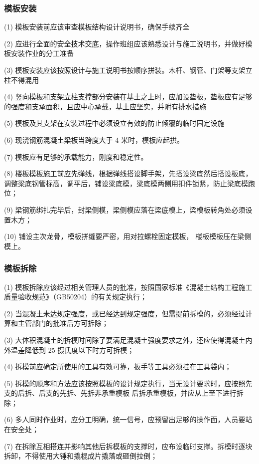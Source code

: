 \subsubsection{模板安装}

(1) 模板安装前应该审查模板结构设计说明书，确保手续齐全

(2) 应进行全面的安全技术交底，操作班组应该熟悉设计与施工说明书，并做好模板安装作业的分工准备

(3) 模板安装应该按照设计与施工说明书按顺序拼装。木杆、钢管、门架等支架立柱不得混用

(4) 竖向模板和支架立柱支撑部分安装在基土之上时，应加设垫板，垫板应有足够的强度和支承面积，且应中心承载，基土应坚实，并附有排水措施

(5) 模板及其支架在安装过程中必须设立有效的防止倾覆的临时固定设施

(6) 现浇钢筋混凝土梁板当跨度大于 4 米时，模板应起拱。

(7) 模板应有足够的承载能力，刚度和稳定性。

(8) 楼板模板施工前应先弹线，根据弹线搭设脚手架，先搭设梁底然后搭设板底，调整梁底钢管标高，调平后，铺设梁底模，梁底模两侧用扣件锁紧，防止梁底模跑位； 

(9) 梁钢筋绑扎完毕后，封梁侧模，梁侧模应落在梁底模上，梁模板转角处必须设置木方； 

(10) 铺设主次龙骨，模板拼缝要严密，用对拉螺栓固定模板， 楼板模板压在梁侧模上。

\subsubsection{模板拆除}

(1) 模板拆除应该经过相关管理人员的批准，按照国家标准《混凝土结构工程施工质量验收规范》（GB50204）的有关规定执行；

(2) 当混凝土未达规定强度，或已经达到规定强度，但需提前拆模的，必须经过计算和主管部门的批准后方可拆除；

(3) 大体积混凝土的拆模时间除了要满足混凝土强度要求之外，还应使得混凝土内外温差降低到 25 摄氏度以下时方可拆模；

(4) 拆模前应确定所使用的工具有效可靠，扳手等工具必须挂在工具袋内；

(5) 拆模的顺序和方法应该按照模板的设计规定执行，当无设计要求时，应按照先支的后拆、后支的先拆、先拆非承重模板
后拆承重模板，并应从上至下进行拆除；

(6) 多人同时作业时，应分工明确，统一信号，应预留出足够的操作面，人员要站在安全处；

(7) 在拆除互相搭连并影响其他后拆模板的支撑时，应布设临时支撑。拆模时逐块拆卸，不得使用大锤和撬棍成片撬落或砸倒拉倒；

